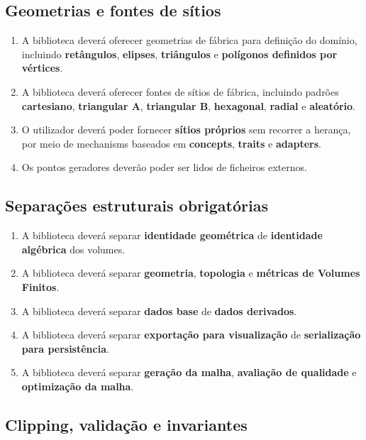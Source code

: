 \subsection{Geometrias e fontes de sítios}

\begin{enumerate}
    \item A biblioteca deverá oferecer geometrias de fábrica para definição do domínio, incluindo \textbf{retângulos}, \textbf{elipses}, \textbf{triângulos} e \textbf{polígonos definidos por vértices}.
    \item A biblioteca deverá oferecer fontes de sítios de fábrica, incluindo padrões \textbf{cartesiano}, \textbf{triangular A}, \textbf{triangular B}, \textbf{hexagonal}, \textbf{radial} e \textbf{aleatório}.
    \item O utilizador deverá poder fornecer \textbf{sítios próprios} sem recorrer a herança, por meio de mechanisms baseados em \textbf{concepts}, \textbf{traits} e \textbf{adapters}.
    \item Os pontos geradores deverão poder ser lidos de ficheiros externos.
\end{enumerate}

\subsection{Separações estruturais obrigatórias}

\begin{enumerate}
    \item A biblioteca deverá separar \textbf{identidade geométrica} de \textbf{identidade algébrica} dos volumes.
    \item A biblioteca deverá separar \textbf{geometria}, \textbf{topologia} e \textbf{métricas de Volumes Finitos}.
    \item A biblioteca deverá separar \textbf{dados base} de \textbf{dados derivados}.
    \item A biblioteca deverá separar \textbf{exportação para visualização} de \textbf{serialização para persistência}.
    \item A biblioteca deverá separar \textbf{geração da malha}, \textbf{avaliação de qualidade} e \textbf{optimização da malha}.
\end{enumerate}

\subsection{Clipping, validação e invariantes}

